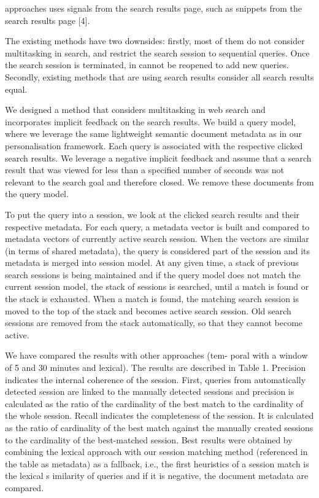 \documentclass{sig-alternate} %
\begin{document}
{%
approaches uses signals from the search results page, such as snippets from the search results page [4].

The existing methods have two downsides: firstly, most
of them do not consider multitasking in search, and restrict
the search session to sequential queries. Once the search
session is terminated, in cannot be reopened to add new
queries. Secondly, existing methods that are using search
results consider all search results equal.


We designed a method that considers multitasking in web
search and incorporates implicit feedback on the search results. 
We build a query model, where we leverage the same
lightweight semantic document metadata as in our personalisation 
framework. Each query is associated with the respective clicked 
search results. We leverage a negative implicit
feedback and assume that a search result that was viewed
for less than a specified number of seconds was not relevant
to the search goal and therefore closed. We remove these
documents from the query model.


To put the query into a session, we look at the clicked
search results and their respective metadata. For each query,
a metadata vector is built and compared to metadata vectors
of currently active search session. When the vectors are similar 
(in terms of shared metadata), the query is considered
part of the session and its metadata is merged into session
model. At any given time, a stack of previous search sessions
is being maintained and if the query model does not match
the current session model, the stack of sessions is searched,
until a match is found or the stack is exhausted. When
a match is found, the matching search session is moved to
the top of the stack and becomes active search session. Old
search sessions are removed from the stack automatically, so
that they cannot become active.


We have compared the results with other approaches (tem-
poral with a window of 5 and 30 minutes and lexical). The
results are described in Table 1. Precision indicates the internal 
coherence of the session. First, queries from automatically 
detected session are linked to the manually detected
sessions and precision is calculated as the ratio of the cardinality 
of the best match to the cardinality of the whole
session. Recall indicates the completeness of the session. It
is calculated as the ratio of cardinality of the best match
against the manually created sessions to the cardinality of
the best-matched session. Best results were obtained by
combining the lexical approach with our session matching
method (referenced in the table as metadata) as a fallback,
i.e., the first heuristics of a session match is the lexical s
imilarity of queries and if it is negative, the document metadata
are compared.

}
\end{document}
